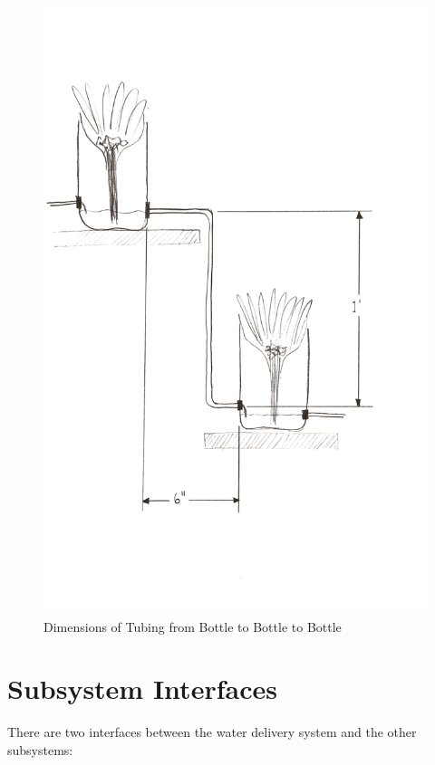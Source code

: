 \documentclass[12pt]{article}
\begin{document}
\pagebreak
\begin{figure}[H]
    \centering
    \includegraphics[width=135mm]{resources/tubing-bottle-to-bottle.png}
    \caption{Dimensions of Tubing from Bottle to Bottle to Bottle}
\end{figure}

\section{Subsystem Interfaces}

There are two interfaces between the water delivery system and the other subsystems:
\end{document}
